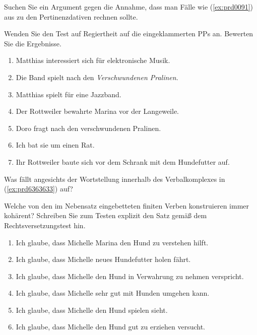 \Uebung[\tristar] \label{u135} Suchen Sie ein Argument gegen die Annahme, dass man Fälle wie (\ref{ex:prd0091}) aus \citet[299]{Eisenberg2} zu den Pertinenzdativen rechnen sollte.

\begin{exe}
\end{exe}

\Uebung \label{u136} Wenden Sie den Test auf Regiertheit auf die eingeklammerten PPs an.
Bewerten Sie die Ergebnisse.

\begin{enumerate}\Lf
  \item Matthias interessiert sich für elektronische Musik.
  \item Die Band spielt nach den \textit{Verschwundenen Pralinen}.
  \item Matthias spielt für eine Jazzband.
  \item Der Rottweiler bewahrte Marina vor der Langeweile.
  \item Doro fragt nach den verschwundenen Pralinen.
  \item Ich bat sie um einen Rat.
  \item Ihr Rottweiler baute sich vor dem Schrank mit dem Hundefutter auf.
\end{enumerate}

\Uebung[\tristar] \label{u136a} Was fällt angesichts der Wortstellung innerhalb des Verbalkomplexes in (\ref{ex:prd6363633}) auf?

\begin{exe}
\end{exe}

\Uebung \label{u137} Welche von den im Nebensatz eingebetteten finiten Verben konstruieren immer kohärent?
Schreiben Sie zum Testen explizit den Satz gemäß dem Rechtsversetzungstest hin.

\begin{enumerate}\Lf
  \item Ich glaube, dass Michelle Marina den Hund zu verstehen hilft.
  \item Ich glaube, dass Michelle neues Hundefutter holen fährt.
  \item Ich glaube, dass Michelle den Hund in Verwahrung zu nehmen verspricht.
  \item Ich glaube, dass Michelle sehr gut mit Hunden umgehen kann.
  \item Ich glaube, dass Michelle den Hund spielen sieht.
  \item Ich glaube, dass Michelle den Hund gut zu erziehen versucht.
\end{enumerate}

